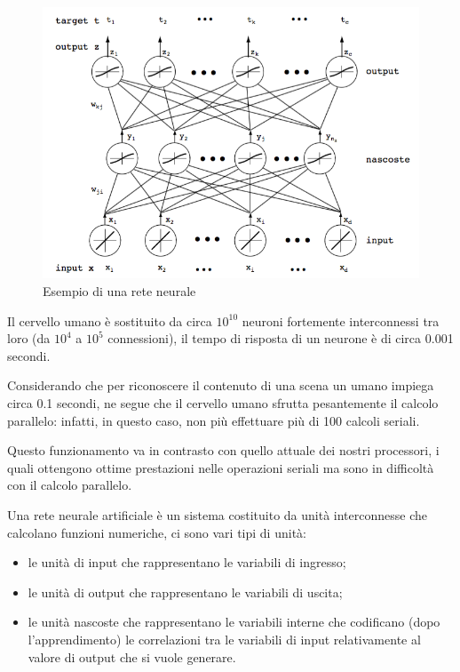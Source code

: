 \begin{figure}[htbp]
\centering
\includegraphics[width=\textwidth]{./notes/immagini/l9-rete.png}
\caption{Esempio di una rete neurale}
\end{figure}

Il cervello umano è sostituito da circa $10^{10}$ neuroni fortemente
interconnessi tra loro (da  $10^{4}$ a  $10^{5}$ connessioni), il tempo di risposta
di un neurone è di circa 0.001 secondi.

Considerando che per riconoscere il contenuto di una scena un umano
impiega circa 0.1 secondi, ne segue che il cervello umano sfrutta
pesantemente il calcolo parallelo: infatti, in questo caso, non più
effettuare più di 100 calcoli seriali.

Questo funzionamento va in contrasto con quello attuale dei nostri
processori, i quali ottengono ottime prestazioni nelle operazioni
seriali ma sono in difficoltà con il calcolo parallelo.

Una rete neurale artificiale è un sistema costituito da unità
interconnesse che calcolano funzioni numeriche, ci sono vari tipi di
unità:

\begin{itemize}

\item
  le unità di input che rappresentano le variabili di ingresso;
\item
  le unità di output che rappresentano le variabili di uscita;
\item
  le unità nascoste che rappresentano le variabili interne che
  codificano (dopo l'apprendimento) le correlazioni tra le variabili di
  input relativamente al valore di output che si vuole generare.
\end{itemize}

